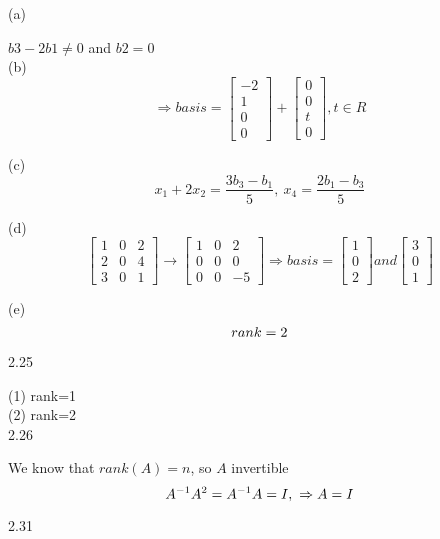 \documentclass[a4paper,12pt]{article}
\begin{document}
(a)

$b3-2b1 \neq 0$ and $b2=0$ \\

(b)
\[
\Rightarrow basis=\begin{bmatrix} -2 \\ 1 \\ 0 \\ 0 \end{bmatrix}+ \begin{bmatrix} 0 \\ 0 \\ t \\0 \end{bmatrix}, 
t \in R
\]

(c)
\[
x_1+2x_2=\frac{3b_3-b_1}{5}, ~
x_4=\frac{2b_1-b_3}{5}
\]

(d)
\[
\begin{bmatrix} 1 & 0 & 2 \\ 2 & 0 & 4 \\ 3 & 0 & 1 \end{bmatrix} \rightarrow \begin{bmatrix}  1 & 0 & 2 \\ 0 & 0 & 0 \\ 0 & 0 & -5 \end{bmatrix} 
\Rightarrow basis=\begin{bmatrix} 1 \\ 0 \\ 2 \end{bmatrix} and \begin{bmatrix} 3 \\ 0 \\ 1 \end{bmatrix}
\]

(e)
\[
rank=2  \\
\]

2.25

(1)
rank=1 \\

(2)
rank=2 \\

2.26

We know that $rank(A)=n$, so $A$ invertible
\[
A^{-1}A^2=A^{-1}A=I,~ \Rightarrow A=I \\
\]

2.31
\end{document}
